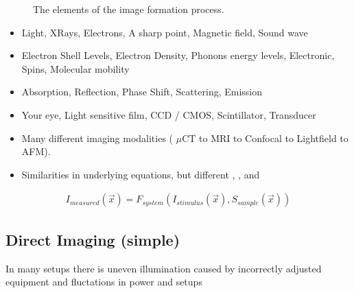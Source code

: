 \documentclass[letterpaper,10pt,english]{sphinxmanual}
\begin{document}
\begin{figure}[htbp]
\centering
\capstart

\noindent{}
\caption{The elements of the image formation process.}\label{\detokenize{04-BasicSegmentation:id3}}\end{figure}
\begin{itemize}
\item {} 
\sphinxAtStartPar
{} Light, X\sphinxhyphen{}Rays, Electrons, A sharp point, Magnetic field, Sound wave

\item {} 
\sphinxAtStartPar
{} Electron Shell Levels, Electron Density, Phonons energy levels, Electronic, Spins, Molecular mobility

\item {} 
\sphinxAtStartPar
{} Absorption, Reflection, Phase Shift, Scattering, Emission

\item {} 
\sphinxAtStartPar
{} Your eye, Light sensitive film, CCD / CMOS, Scintillator, Transducer

\end{itemize}


\begin{itemize}
\item {} 
\sphinxAtStartPar
Many different imaging modalities ( \(\mu \textrm{CT}\) to MRI to Confocal to Light\sphinxhyphen{}field to AFM).

\item {} 
\sphinxAtStartPar
Similarities in underlying equations, but different , , and 

\end{itemize}
\begin{equation*}
\begin{split}I_{measured}(\vec{x})=F_{system}(I_{stimulus}(\vec{x}),S_{sample}(\vec{x}))\end{split}
\end{equation*}

\subsection{Direct Imaging (simple)}
\label{\detokenize{04-BasicSegmentation:direct-imaging-simple}}
\sphinxAtStartPar
In many setups there is un\sphinxhyphen{}even illumination caused by incorrectly adjusted equipment and fluctations in power and setups
\end{document}
